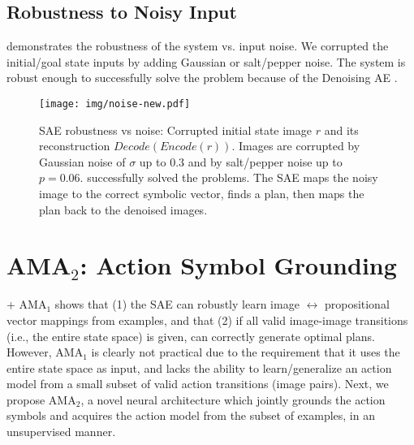 \documentclass[11pt]{article}
\begin{document}
\subsection{Robustness to Noisy Input}

\label{sec:noise-experiments}

 demonstrates the robustness of the system vs. input noise.
We corrupted the initial/goal state inputs by adding Gaussian or salt/pepper noise.
The system is robust enough to successfully solve the problem
because of the Denoising AE \cite{vincent2008extracting}.

\begin{figure}[tbp]
 \centering
 \texttt{[image: img/noise-new.pdf]}
 \caption{
SAE robustness vs noise:
  Corrupted initial state image $r$ and its reconstruction $Decode(Encode(r))$.
 Images are corrupted by Gaussian noise of $\sigma$ up to $0.3$ and by salt/pepper noise up to $p=0.06$.
 \latentplanner successfully solved the problems.
 The SAE maps the noisy image to the correct symbolic vector, finds a plan, then
 maps the plan back to the denoised images.
 }
  \label{fig:noise}
\end{figure}

% 


\section{AMA$_2$: Action Symbol Grounding}
\label{sec:ama2-overview}

\latentplanner + AMA$_1$ shows that (1) the SAE can robustly learn image $\leftrightarrow$ propositional vector mappings from examples, and that (2) if all valid image-image transitions (i.e., the entire state space) is given, \latentplanner can correctly generate optimal plans.
However, AMA$_1$ is clearly not practical due to the requirement that it uses the entire state space as input, and lacks the ability to learn/generalize an action model from a small subset of valid action transitions (image pairs).
Next, we propose AMA$_2$, a novel neural architecture  which jointly grounds the action symbols and acquires the action model from the subset of examples, in an unsupervised manner.
\end{document}
